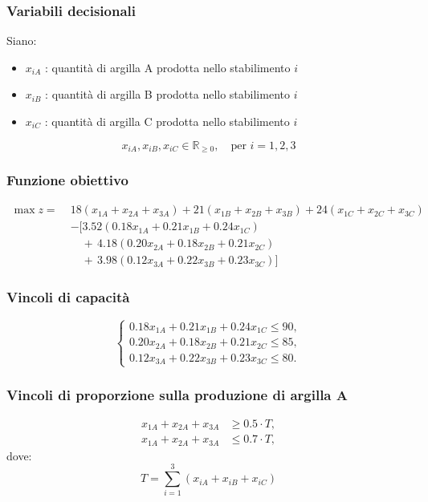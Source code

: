 \subsubsection{Variabili decisionali}
Siano:
\begin{itemize}
    \item $x_{iA}$ : quantità di argilla A prodotta nello stabilimento $i$
    \item $x_{iB}$ : quantità di argilla B prodotta nello stabilimento $i$
    \item $x_{iC}$ : quantità di argilla C prodotta nello stabilimento $i$
\end{itemize}
\begin{equation}
x_{iA}, x_{iB}, x_{iC} \in \mathbb{R}_{\geq 0}, \quad \text{per } i=1,2,3
\end{equation}

\subsubsection{Funzione obiettivo}
\begin{align*}
\max z =\; & 18(x_{1A} + x_{2A} + x_{3A}) + 21(x_{1B} + x_{2B} + x_{3B}) + 24(x_{1C} + x_{2C} + x_{3C}) \\
& - \Big[ 3.52(0.18x_{1A} + 0.21x_{1B} + 0.24x_{1C}) \\
& \quad +\, 4.18(0.20x_{2A} + 0.18x_{2B} + 0.21x_{2C}) \\
& \quad +\, 3.98(0.12x_{3A} + 0.22x_{3B} + 0.23x_{3C}) \Big]
\end{align*}

\subsubsection{Vincoli di capacità}
\[
\begin{cases}
0.18x_{1A}+0.21x_{1B}+0.24x_{1C} \leq 90, \\
0.20x_{2A}+0.18x_{2B}+0.21x_{2C} \leq 85, \\
0.12x_{3A}+0.22x_{3B}+0.23x_{3C} \leq 80.
\end{cases}
\]

\subsubsection{Vincoli di proporzione sulla produzione di argilla A}
\begin{align}
x_{1A}+x_{2A}+x_{3A} &\geq 0.5 \cdot T, \\
x_{1A}+x_{2A}+x_{3A} &\leq 0.7 \cdot T,
\end{align}
dove: 
\[
T = \sum_{i=1}^{3}(x_{iA}+x_{iB}+x_{iC})
\]

